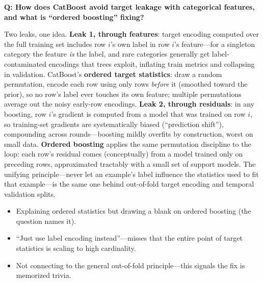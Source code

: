 \begin{interviewq}
\textbf{Q: How does CatBoost avoid target leakage with categorical features, and what is ``ordered boosting'' fixing?}

 \quad {} \quad \badgefreq{\freqmed}

\stronganswer

Two leaks, one idea. \textbf{Leak 1, through features}: target encoding computed over the full training set includes row $i$'s own label in row $i$'s feature---for a singleton category the feature \textit{is} the label, and rare categories generally get label-contaminated encodings that trees exploit, inflating train metrics and collapsing in validation. CatBoost's \textbf{ordered target statistics}: draw a random permutation, encode each row using only rows \textit{before} it (smoothed toward the prior), so no row's label ever touches its own feature; multiple permutations average out the noisy early-row encodings. \textbf{Leak 2, through residuals}: in any boosting, row $i$'s gradient is computed from a model that was trained on row $i$, so training-set gradients are systematically biased (``prediction shift''), compounding across rounds---boosting mildly overfits by construction, worst on small data. \textbf{Ordered boosting} applies the same permutation discipline to the loop: each row's residual comes (conceptually) from a model trained only on preceding rows, approximated tractably with a small set of support models. The unifying principle---never let an example's label influence the statistics used to fit that example---is the same one behind out-of-fold target encoding and temporal validation splits.

\redflags
\begin{itemize}
    \item Explaining ordered statistics but drawing a blank on ordered boosting (the question names it).
    \item ``Just use label encoding instead''---misses that the entire point of target statistics is scaling to high cardinality.
    \item Not connecting to the general out-of-fold principle---this signals the fix is memorized trivia.
\end{itemize}



\end{interviewq}
